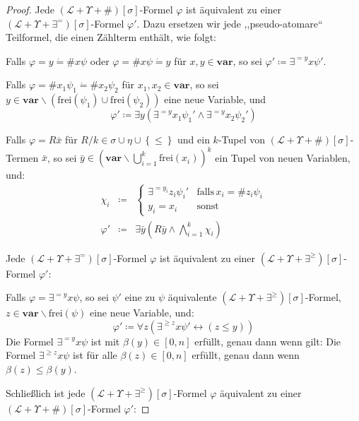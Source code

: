 \begin{proof}
Jede $\left(\mathcal{L}+\Upsilon+\#\right)\left[\sigma\right]$-Formel
$\varphi$ ist äquivalent zu einer $\left(\mathcal{L}+\Upsilon+\exists^{=}\right)\left[\sigma\right]$-Formel
$\varphi'$. Dazu ersetzen wir jede ,,pseudo-atomare`` Teilformel,
die einen Zählterm enthält, wie folgt:

\begin{casenv}
\item Falls $\varphi=y\dot{=}\#x\psi$ oder $\varphi=\#x\psi\dot{=}y$ für
$x,y\in\mathbf{var}$, so sei $\varphi'\coloneqq\exists^{=y}x\psi'$.
\item Falls $\varphi=\#x_{1}\psi_{1}\dot{=}\#x_{2}\psi_{2}$ für $x_{1},x_{2}\in\mathbf{var}$,
so sei $y\in\mathbf{var}\backslash\left(\mathrm{frei}\left(\psi_{1}\right)\cup\mathrm{frei}\left(\psi_{2}\right)\right)$
eine neue Variable, und
\[
\varphi'\coloneqq\exists y\left(\exists^{=y}x_{1}\psi_{1}'\wedge\exists^{=y}x_{2}\psi_{2}'\right)
\]
\item Falls $\varphi=R\bar{x}$ für $R/k\in\sigma\cup\eta\cup\left\{ \leqslant\right\} $
und ein $k$-Tupel von $\left(\mathcal{L}+\Upsilon+\#\right)\left[\sigma\right]$-Termen
$\bar{x}$, so sei $\bar{y}\in\left(\mathbf{var}\backslash\bigcup_{i=1}^{k}\mathrm{frei}\left(x_{i}\right)\right)^{k}$
ein Tupel von neuen Variablen, und:
\begin{eqnarray*}
\chi_{i} & \coloneqq & \begin{cases}
\exists^{=y_{i}}z_{i}\psi_{i}' & \mathrm{falls}\,x_{i}=\#z_{i}\psi_{i}\\
y_{i}=x_{i} & \mathrm{sonst}
\end{cases}\\
\varphi' & \coloneqq & \exists\bar{y}\left(R\bar{y}\wedge\bigwedge_{i=1}^{k}\chi_{i}\right)
\end{eqnarray*}
\end{casenv}
Jede $\left(\mathcal{L}+\Upsilon+\exists^{=}\right)\left[\sigma\right]$-Formel
$\varphi$ ist äquivalent zu einer $\left(\mathcal{L}+\Upsilon+\exists^{\geqslant}\right)\left[\sigma\right]$-Formel
$\varphi'$:

\begin{casenv}
\item Falls $\varphi=\exists^{=y}x\psi$, so sei $\psi'$ eine zu $\psi$
äquivalente $\left(\mathcal{L}+\Upsilon+\exists^{\geqslant}\right)\left[\sigma\right]$-Formel,
$z\in\mathbf{var}\backslash\mathrm{frei}\left(\psi\right)$ eine neue
Variable, und: 
\[
\varphi'\coloneqq\forall z\left(\exists^{\geqslant z}x\psi'\leftrightarrow\left(z\leqslant y\right)\right)
\]
Die Formel $\exists^{=y}x\psi$ ist mit $\beta\left(y\right)\in\left[0,n\right]$
erfüllt, genau dann wenn gilt: Die Formel $\exists^{\geqslant z}x\psi$
ist für alle $\beta\left(z\right)\in\left[0,n\right]$ erfüllt, genau
dann wenn $\beta\left(z\right)\leqslant\beta\left(y\right)$.
\end{casenv}
Schließlich ist jede $\left(\mathcal{L}+\Upsilon+\exists^{\geqslant}\right)\left[\sigma\right]$-Formel
$\varphi$ äquivalent zu einer $\left(\mathcal{L}+\Upsilon+\#\right)\left[\sigma\right]$-Formel
$\varphi'$:


\end{proof}

